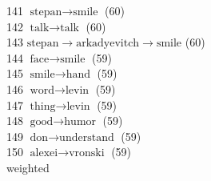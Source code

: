 \begin{appendices}
   141  $ \text{stepan} \to \text{smile} $ (60) \\
   142  $ \text{talk} \to \text{talk} $ (60) \\
   143  $ \text{stepan} \to \text{arkadyevitch} \to \text{smile} $ (60) \\
   144  $ \text{face} \to \text{smile} $ (59) \\
   145  $ \text{smile} \to \text{hand} $ (59) \\
   146  $ \text{word} \to \text{levin} $ (59) \\
   147  $ \text{thing} \to \text{levin} $ (59) \\
   148  $ \text{good} \to \text{humor} $ (59) \\
   149  $ \text{don} \to \text{understand} $ (59) \\
   150  $ \text{alexei} \to \text{vronski} $ (59) \\

weighted


\end{appendices}
